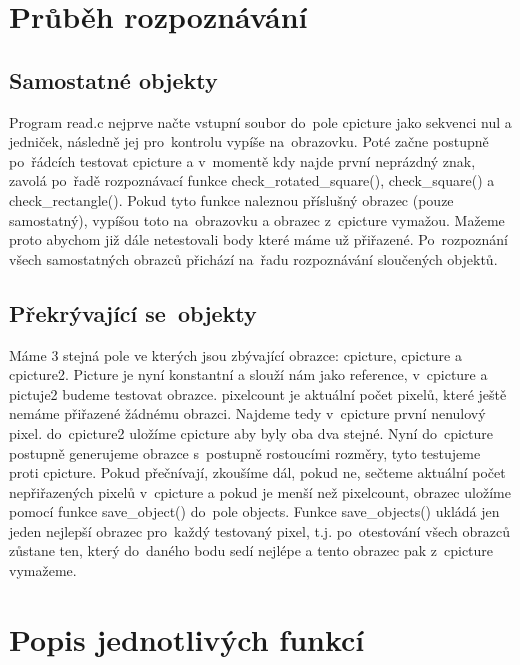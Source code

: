 \documentclass[12pt]{article}
\begin{document}
\section{Průběh rozpoznávání}
\subsection{Samostatné objekty}
Program read.c nejprve načte vstupní soubor do~pole cpicture jako sekvenci nul a jedniček, následně jej pro~kontrolu vypíše na~obrazovku. Poté začne postupně po~řádcích testovat cpicture a v~momentě kdy najde první neprázdný znak, zavolá po~řadě rozpoznávací funkce check\_rotated\_square(), check\_square() a check\_rectangle(). Pokud tyto funkce naleznou příslušný obrazec (pouze samostatný), vypíšou toto na~obrazovku a obrazec z~cpicture vymažou. Mažeme proto abychom již dále netestovali body které máme už přiřazené. Po~rozpoznání všech samostatných obrazců přichází na~řadu rozpoznávání sloučených objektů.

\subsection{Překrývající se~objekty}
Máme 3 stejná pole ve kterých jsou zbývající obrazce: cpicture, cpicture a cpicture2. Picture je nyní konstantní a slouží nám jako reference, v~cpicture a pictuje2 budeme testovat obrazce. pixelcount je aktuální počet pixelů, které ještě nemáme přiřazené žádnému obrazci. Najdeme tedy v~cpicture první nenulový pixel. do~cpicture2 uložíme cpicture aby byly oba dva stejné. Nyní do~cpicture postupně generujeme obrazce s~postupně rostoucími rozměry, tyto testujeme proti cpicture. Pokud přečnívají, zkoušíme dál, pokud ne, sečteme aktuální počet nepřiřazených pixelů v~cpicture a pokud je menší než pixelcount, obrazec uložíme pomocí funkce save\_object() do~pole objects. Funkce save\_objects() ukládá jen jeden nejlepší obrazec pro~každý testovaný pixel, t.j. po~otestování všech obrazců zůstane ten, který do~daného bodu sedí nejlépe a tento obrazec pak z~cpicture vymažeme.

\section{Popis jednotlivých funkcí}
\end{document}
